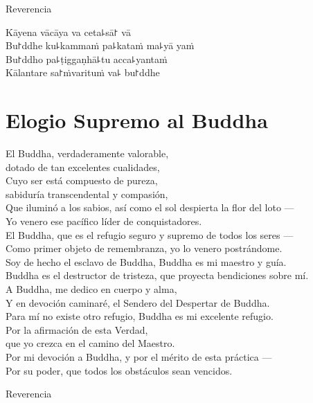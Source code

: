 \begin{instruction}
  Reverencia
\end{instruction}

Kāyena vācāya va ceta꜕sā꜓ vā\\
Bu꜓ddhe ku꜕kammaṁ pa꜕kataṁ ma꜕yā yaṁ\\
Bu꜓ddho pa꜕ṭiggaṇhā꜕tu acca꜕yantaṁ\\
Kālantare sa꜓ṁvarituṁ va꜕ bu꜓ddhe

\clearpage

\chapter{Elogio Supremo al Buddha}

\begin{leader}
\end{leader}

El Buddha, verdaderamente valorable,\\
\vin dotado de tan excelentes cualidades,\\
Cuyo ser está compuesto de pureza,\\
\vin sabiduría transcendental y compasión,\\
Que iluminó a los sabios, así como el sol despierta la flor del loto ---\\
Yo venero ese pacífico líder de conquistadores.\\
El Buddha, que es el refugio seguro y supremo de todos los seres ---\\
Como primer objeto de remembranza, yo lo venero postrándome.\\
Soy de hecho el esclavo de Buddha, Buddha es mi maestro y guía.\\
Buddha es el destructor de tristeza, que proyecta bendiciones sobre mí.\\
A Buddha, me dedico en cuerpo y alma,\\
Y en devoción caminaré, el Sendero del Despertar de Buddha.\\
Para mí no existe otro refugio, Buddha es mi excelente refugio.\\
Por la afirmación de esta Verdad,\\
\vin que yo crezca en el camino del Maestro.\\
Por mi devoción a Buddha, y por el mérito de esta práctica ---\\
Por su poder, que todos los obstáculos sean vencidos.

\begin{instruction}
  Reverencia
\end{instruction}

